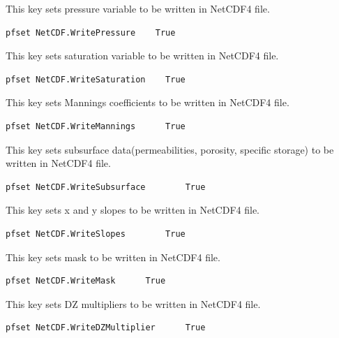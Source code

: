 {This key sets pressure variable to be written in NetCDF4 file.}
\begin{display}\begin{verbatim}
pfset NetCDF.WritePressure    True
\end{verbatim}\end{display}

{This key sets saturation variable to be written in NetCDF4 file.}
\begin{display}\begin{verbatim}
pfset NetCDF.WriteSaturation    True
\end{verbatim}\end{display}

{This key sets Mannings coefficients to be written in NetCDF4 file.}
\begin{display}\begin{verbatim}
pfset NetCDF.WriteMannings	    True
\end{verbatim}\end{display}

{This key sets subsurface data(permeabilities, porosity, specific storage) to be written in NetCDF4 file.}
\begin{display}\begin{verbatim}
pfset NetCDF.WriteSubsurface	    True
\end{verbatim}\end{display}

{This key sets x and y slopes to be written in NetCDF4 file.}
\begin{display}\begin{verbatim}
pfset NetCDF.WriteSlopes	    True
\end{verbatim}\end{display}

{This key sets mask to be written in NetCDF4 file.}
\begin{display}\begin{verbatim}
pfset NetCDF.WriteMask	    True
\end{verbatim}\end{display}

{This key sets DZ multipliers to be written in NetCDF4 file.}
\begin{display}\begin{verbatim}
pfset NetCDF.WriteDZMultiplier	    True
\end{verbatim}\end{display}

